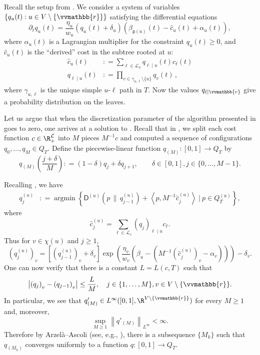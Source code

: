 \documentclass{toc}
\newcommand{\Bigmid}{~\Big|~}
\newcommand{\calL}{\mathcal L}
\newcommand{\dmid}{\,\|\,}
\newcommand{\vvr}{\vvmathbb{r}}
\newcommand{\seteq}{\mathrel{\mathop:}=}
\newcommand{\sfp}{\mathsf{p}}
\newcommand{\sfD}{\mathsf D}
\newcommand{\llangle}{\left\langle}
\newcommand{\rrangle}{\right\rangle}
\DeclareMathOperator{\argmin}{\mathrm{argmin}}
\begin{document}
Recall the setup from .
We consider a system of variables $\{q_u(t) : u \in V \setminus \{\vvr\}\}$
satisfying the differential equations
\begin{equation}\label{eq:star-dynamics2}
\partial_t q_u(t) = \frac{\eta_u}{w_u} \left(q_u(t)+\delta_u\right) \left(\beta_{\sfp(u)}(t) - \hat{c}_u(t) + \alpha_u(t)\right),
\end{equation}
where $\alpha_u(t)$ is a Lagrangian multiplier for the constraint $q_u(t)\ge 0$, and $\hat{c}_u(t)$ is the ``derived'' cost
in the subtree rooted at $u$:
\begin{align*}
\hat{c}_u(t) &\seteq \sum_{\ell \in \calL_u} q_{\ell\mid u}(t) c_{\ell}(t)\\
q_{\ell \mid u}(t) &\seteq \prod_{v \in \gamma_{u,\ell} \setminus \{u\}} q_v(t)\,,\nonumber
\end{align*}
where $\gamma_{u,\ell}$ is the unique simple $u$-$\ell$ path in $T$.
Now the values $q_{\ell \mid \vvr}$ give a probability distribution on the leaves.

Let us argue that when 
the discretization parameter of the
algorithm presented in  goes to zero,
one arrives at a solution to .
Recall that in , we split each cost function $c\in\R_+^{\calL}$
into $M$ pieces $M^{-1} c$ and computed a sequence of
configurations $q_0,\dots,q_M \in Q_T$.
Define the piecewise-linear function $q_{(M)} : [0,1] \to Q_T$ by
\[
q_{(M)}\left(\frac{j+\delta}{M}\right) \seteq (1-\delta) q_{j} + \delta q_{j+1}, \qquad \delta \in [0,1], j \in \{0,\ldots,M-1\}.
\]

Recalling , we have
\begin{align}\label{eq:qeps}
q_j^{(u)} &\seteq \argmin\left\{ \sfD^{(u)}\!\left(p \dmid q_{j-1}^{(u)}\right) +  \llangle p, M^{-1} \hat{c}_j^{(u)} \rrangle \Bigmid p \in
Q^{(u)}_T\right\},
\end{align}
where
\[
\hat{c}_j^{(u)} = \sum_{\ell \in \calL_v} (q_j)_{\ell \mid u} c_{\ell}.
\]
Thus for $v \in \chi(u)$ and $j \geq 1$,
\[
\left(q_j^{(u)}\right)_v = \left[\left(q_{j-1}^{(u)}\right)_v + \delta_v\right] \exp\left(\frac{\eta_v}{w_v} \left(\beta_u - (M^{-1}(\hat{c}^{(u)}_j)_v - \alpha_v)\right)\right) - \delta_v.
\]
One can now verify that there is a constant $L=L(c,T)$ such that
\[
\left|\left(q_j\right)_v - \left(q_{j-1}\right)_v\right| \leq \frac{L}{M}, \quad j \in \{1,\ldots,M\}, v \in V \setminus \{\vvr\}.
\]
In particular, we see that $q'_{(M)} \in L^{\infty}([0,1],\R^{V \setminus \{\vvr\}})$ for every $M \geq 1$ and, moreover,
\begin{equation}\label{eq:derivbnd}
\sup_{M \geq 1} \left\|q'_{(M)}\right\|_{L^{\infty}} < \infty.
\end{equation}
Therefore by Arzel\`a--Ascoli (see, e.g., \cite[Thm. 0.3.1]{AC84}), there is a subsequence $\{M_k\}$ such that $q_{(M_k)}$ converges uniformly %
to a function $q : [0,1] \to Q_T$.
\end{document}

